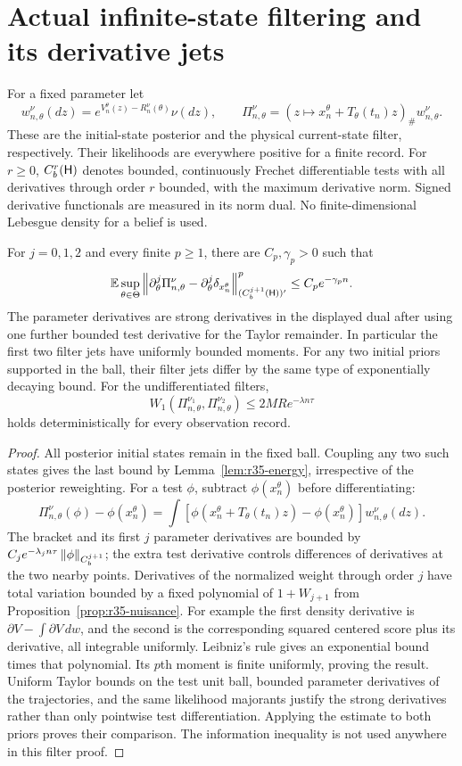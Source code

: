\section{Actual infinite-state filtering and its derivative jets}
\label{sec:r35-filter}
For a fixed parameter let
\[
 w_{n,\theta}^\nu(dz)=e^{V_n^\theta(z)-R_n^\nu(\theta)}\nu(dz),\qquad
 \Pi_{n,\theta}^\nu=(z\mapsto x_n^\theta+T_\theta(t_n)z)_\#w_{n,\theta}^\nu.
\]
These are the initial-state posterior and the physical current-state filter, respectively. Their likelihoods are everywhere positive for a finite record. For $r\ge0$, $C_b^r(\mathsf H)$ denotes bounded, continuously Frechet differentiable tests with all derivatives through order $r$ bounded, with the maximum derivative norm. Signed derivative functionals are measured in its norm dual. No finite-dimensional Lebesgue density for a belief is used.

\begin{theorem}\label{thm:r35-filter}
For $j=0,1,2$ and every finite $p\ge1$, there are $C_p,\gamma_p>0$ such that
\[
 \mathbb E\sup_{\theta\in\Theta}
 \left\|\partial_\theta^j\Pi_{n,\theta}^\nu
       -\partial_\theta^j\delta_{x_n^\theta}\right\|_{(C_b^{j+1}(\mathsf H))'}^p
 \le C_p e^{-\gamma_p n}.
\]
The parameter derivatives are strong derivatives in the displayed dual after using one further bounded test derivative for the Taylor remainder. In particular the first two filter jets have uniformly bounded moments. For any two initial priors supported in the ball, their filter jets differ by the same type of exponentially decaying bound. For the undifferentiated filters,
\[
 W_1(\Pi_{n,\theta}^{\nu_1},\Pi_{n,\theta}^{\nu_2})
 \le 2MR e^{-\lambda n\tau}
\]
holds deterministically for every observation record.
\end{theorem}
\begin{proof}
All posterior initial states remain in the fixed ball. Coupling any two such states gives the last bound by Lemma~\ref{lem:r35-energy}, irrespective of the posterior reweighting.
For a test $\phi$, subtract $\phi(x_n^\theta)$ before differentiating:
\[
 \Pi_{n,\theta}^\nu(\phi)-\phi(x_n^\theta)
 =\int[\phi(x_n^\theta+T_\theta(t_n)z)-\phi(x_n^\theta)]w_{n,\theta}^\nu(dz).
\]
The bracket and its first $j$ parameter derivatives are bounded by
$C_j e^{-\lambda_j n\tau}\left\|\phi\right\|_{C_b^{j+1}}$; the extra test derivative controls differences of derivatives at the two nearby points. Derivatives of the normalized weight through order $j$ have total variation bounded by a fixed polynomial of $1+W_{j+1}$ from Proposition~\ref{prop:r35-nuisance}. For example the first density derivative is $\partial V-\int\partial V\,dw$, and the second is the corresponding squared centered score plus its derivative, all integrable uniformly.
Leibniz's rule gives an exponential bound times that polynomial. Its $p$th moment is finite uniformly, proving the result. Uniform Taylor bounds on the test unit ball, bounded parameter derivatives of the trajectories, and the same likelihood majorants justify the strong derivatives rather than only pointwise test differentiation. Applying the estimate to both priors proves their comparison. The information inequality is not used anywhere in this filter proof.
\end{proof}


